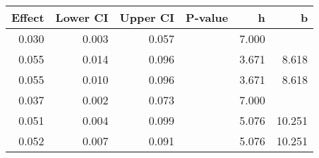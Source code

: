 \begin{table}[ht]
\centering
\begin{tabular}{rrrrrr}
  \hline
Effect & Lower CI & Upper CI & P-value & h & b \\ 
  \hline
0.030 & 0.003 & 0.057 &  & 7.000 &  \\ 
  0.055 & 0.014 & 0.096 &  & 3.671 & 8.618 \\ 
  0.055 & 0.010 & 0.096 &  & 3.671 & 8.618 \\ 
  0.037 & 0.002 & 0.073 &  & 7.000 &  \\ 
  0.051 & 0.004 & 0.099 &  & 5.076 & 10.251 \\ 
  0.052 & 0.007 & 0.091 &  & 5.076 & 10.251 \\ 
   \hline
\end{tabular}
\end{table}
